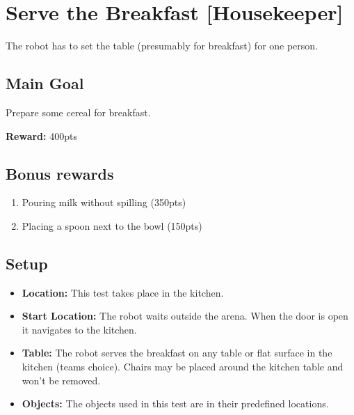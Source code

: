 \section{Serve the Breakfast [Housekeeper]}
\label{test:serve-the-breakfast}
The robot has to set the table (presumably for breakfast) for one person.


\subsection*{Main Goal}
Prepare some cereal for breakfast.

\noindent\textbf{Reward:} 400pts

\subsection*{Bonus rewards}
\begin{enumerate}[nosep]
	\item Pouring milk without spilling (350pts)
	\item Placing a spoon next to the bowl (150pts)
\end{enumerate}

\subsection*{Setup}
\begin{itemize}[nosep]
	\item \textbf{Location:} This test takes place in the kitchen.
	\item \textbf{Start Location:} The robot waits outside the arena. When the door is open it navigates to the kitchen.
	\item \textbf{Table:} The robot serves the breakfast on any table or flat surface in the kitchen (teams choice). Chairs may be placed around the kitchen table and won't be removed.
	\item \textbf{Objects:} The objects used in this test are in their predefined locations.
\end{itemize}


